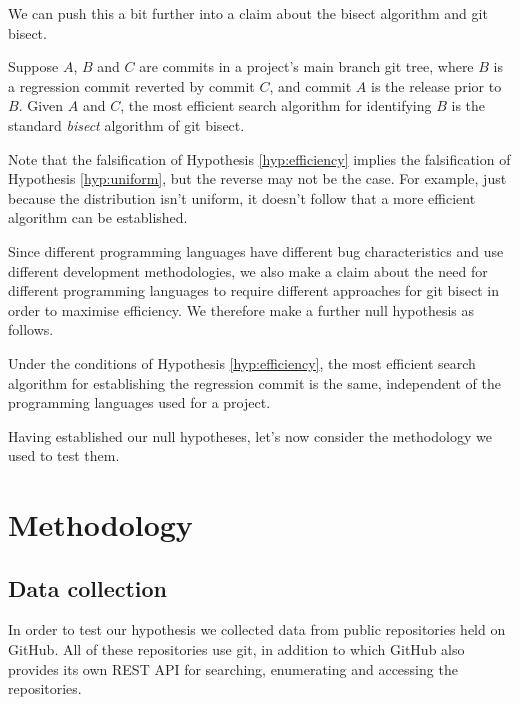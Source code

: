 \documentclass[10pt,journal,compsoc]{IEEEtran}
\begin{document}
We can push this a bit further into a claim about the bisect algorithm and {\code git bisect}.

\begin{hypothesis}
\label{hyp:efficiency}
Suppose $A$, $B$ and $C$ are commits in a project's main branch git tree, where $B$ is a regression commit reverted by commit $C$, and commit $A$ is the release prior to $B$. Given $A$ and $C$, the most efficient search algorithm for identifying $B$ is the standard {\it bisect\/} algorithm of {\code git bisect}.
\end{hypothesis}

Note that the falsification of Hypothesis \ref{hyp:efficiency} implies the falsification of Hypothesis \ref{hyp:uniform}, but the reverse may not be the case. For example, just because the distribution isn't uniform, it doesn't follow that a more efficient algorithm can be established.

Since different programming languages have different bug characteristics \cite{nanz2015} and use different development methodologies, we also make a claim about the need for different programming languages to require different approaches for {\code git bisect} in order to maximise efficiency. We therefore make a further null hypothesis as follows.

\begin{hypothesis}
\label{hyp:algorithm}
Under the conditions of Hypothesis \ref{hyp:efficiency}, the most efficient search algorithm for establishing the regression commit is the same, independent of the programming languages used for a project.
\end{hypothesis}

Having established our null hypotheses, let's now consider the methodology we used to test them.

\section{Methodology}

\subsection{Data collection}

In order to test our hypothesis we collected data from public repositories held on GitHub. All of these repositories use {\code git}, in addition to which GitHub also provides its own REST API for searching, enumerating and accessing the repositories.
\end{document}
